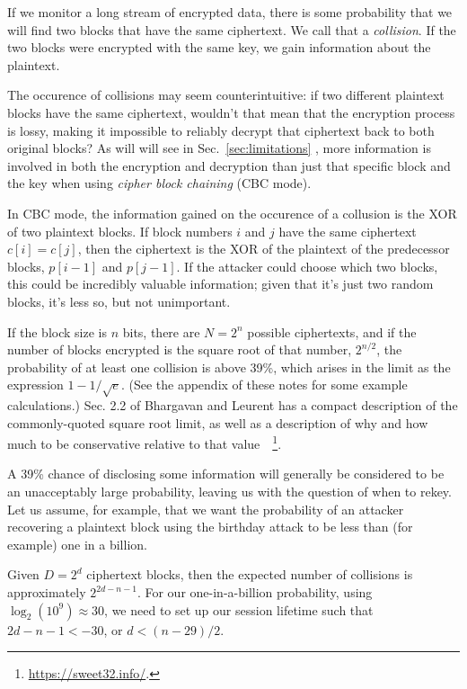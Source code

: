 If we monitor a long stream of encrypted data, there is some
probability that we will find two blocks that have the same
ciphertext.  We call that a \emph{collision}.  If the two blocks were
encrypted with the same key, we gain information about the plaintext.

The occurence of collisions may seem counterintuitive: if two
different plaintext blocks have the same ciphertext, wouldn't that
mean that the encryption process is lossy, making it impossible to
reliably decrypt that ciphertext back to both original blocks?  As
will will see in Sec.~\ref{sec:limitations} , more information is
involved in both the encryption and decryption than just that specific
block and the key when using \emph{cipher block chaining} (CBC mode).

In CBC mode, the information gained on the occurence of a collusion is
the XOR of two plaintext blocks.  If block numbers $i$ and $j$ have
the same ciphertext $c[i] = c[j]$, then the ciphertext is the XOR of
the plaintext of the predecessor blocks, $p[i-1]$ and $p[j-1]$.  If
the attacker could choose which two blocks, this could be incredibly
valuable information; given that it's just two random blocks, it's
less so, but not unimportant.  

If the block size is $n$ bits, there are $N = 2^n$ possible
ciphertexts, and if the number of blocks encrypted is the square root
of that number, $2^{n/2}$, the probability of at least one collision
is above 39\%, which arises in the limit as the expression
$1-1/\sqrt{e}$.  (See the appendix of these notes for some example
calculations.)  Sec. 2.2 of Bhargavan and Leurent has a compact
description of the commonly-quoted square root limit, as well as
a description of why and how much to be conservative relative to that
value~\cite{bhargavan2016practical}~\footnote{\url{https://sweet32.info/}.}.

A 39\% chance of disclosing some information will generally be
considered to be an unacceptably large probability, leaving us with
the question of when to rekey.  Let us assume, for example, that we
want the probability of an attacker recovering a plaintext block using
the birthday attack to be less than (for example) one in a billion.

Given $D = 2^d$ ciphertext blocks, then the expected number of
collisions is approximately $2^{2d-n-1}$.  For our one-in-a-billion
probability, using $\log_2(10^9) \approx 30$, we need to set up our
session lifetime such that $2d-n-1 < -30$, or $d < (n-29)/2$.

